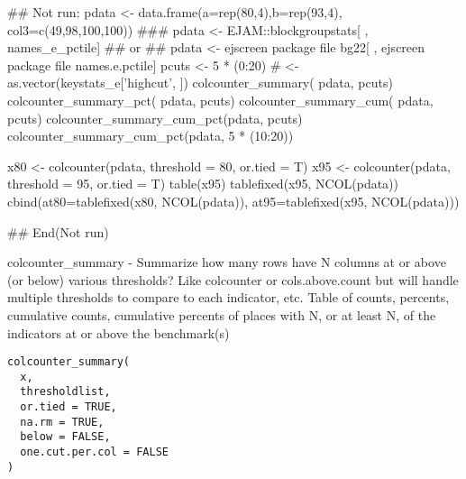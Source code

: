 \documentclass[a4paper]{book}
\begin{document}
%
\begin{Examples}
\begin{ExampleCode}
## Not run: 
 pdata <- data.frame(a=rep(80,4),b=rep(93,4), col3=c(49,98,100,100))
  ### pdata <- EJAM::blockgroupstats[ , names_e_pctile]
  ## or ## pdata <- ejscreen package file bg22[ , ejscreen package file names.e.pctile]
 pcuts <-  5 * (0:20)  # <- as.vector(keystats_e['highcut', ])
colcounter_summary(        pdata, pcuts)
colcounter_summary_pct(    pdata, pcuts)
colcounter_summary_cum(    pdata, pcuts)
colcounter_summary_cum_pct(pdata, pcuts)
colcounter_summary_cum_pct(pdata, 5 * (10:20))

x80 <- colcounter(pdata, threshold = 80, or.tied = T)
x95 <- colcounter(pdata, threshold = 95, or.tied = T)
table(x95)
tablefixed(x95, NCOL(pdata))
cbind(at80=tablefixed(x80, NCOL(pdata)), at95=tablefixed(x95, NCOL(pdata)))
  
## End(Not run)

\end{ExampleCode}
\end{Examples}
%
\begin{Description}\relax
colcounter\_summary - Summarize how many rows have N columns at or above (or below) various thresholds?
Like colcounter or cols.above.count
but will handle multiple thresholds to compare to each indicator, etc.
Table of counts, percents, cumulative counts, cumulative percents
of places with N, or at least N, of the indicators
at or above the benchmark(s)
\end{Description}
%
\begin{Usage}
\begin{verbatim}
colcounter_summary(
  x,
  thresholdlist,
  or.tied = TRUE,
  na.rm = TRUE,
  below = FALSE,
  one.cut.per.col = FALSE
)
\end{verbatim}
\end{Usage}
%
\end{document}
